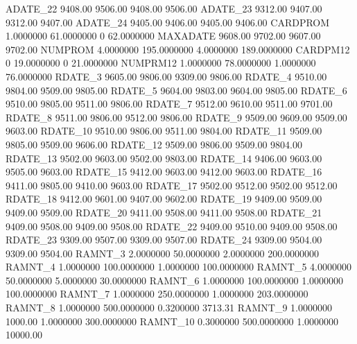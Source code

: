\documentclass[
  11pt,
  a4paper,
  DIV=12,captions=tableheading,oneside,titlepage]{scrbook}
\let\oldverbatim\verbatim
\let\endoldverbatim\endverbatim
\renewenvironment{verbatim}{\footnotesize\oldverbatim}{\endoldverbatim}
\begin{document}
\begin{verbatim}
  ADATE_22         9408.00       9506.00       9408.00       9506.00 
  ADATE_23         9312.00       9407.00       9312.00       9407.00 
  ADATE_24         9405.00       9406.00       9405.00       9406.00 
  CARDPROM       1.0000000    61.0000000             0    62.0000000 
  MAXADATE         9608.00       9702.00       9607.00       9702.00 
  NUMPROM        4.0000000   195.0000000     4.0000000   189.0000000 
  CARDPM12               0    19.0000000             0    21.0000000 
  NUMPRM12       1.0000000    78.0000000     1.0000000    76.0000000 
  RDATE_3          9605.00       9806.00       9309.00       9806.00 
  RDATE_4          9510.00       9804.00       9509.00       9805.00 
  RDATE_5          9604.00       9803.00       9604.00       9805.00 
  RDATE_6          9510.00       9805.00       9511.00       9806.00 
  RDATE_7          9512.00       9610.00       9511.00       9701.00 
  RDATE_8          9511.00       9806.00       9512.00       9806.00 
  RDATE_9          9509.00       9609.00       9509.00       9603.00 
  RDATE_10         9510.00       9806.00       9511.00       9804.00 
  RDATE_11         9509.00       9805.00       9509.00       9606.00 
  RDATE_12         9509.00       9806.00       9509.00       9804.00 
  RDATE_13         9502.00       9603.00       9502.00       9803.00 
  RDATE_14         9406.00       9603.00       9505.00       9603.00 
  RDATE_15         9412.00       9603.00       9412.00       9603.00 
  RDATE_16         9411.00       9805.00       9410.00       9603.00 
  RDATE_17         9502.00       9512.00       9502.00       9512.00 
  RDATE_18         9412.00       9601.00       9407.00       9602.00 
  RDATE_19         9409.00       9509.00       9409.00       9509.00 
  RDATE_20         9411.00       9508.00       9411.00       9508.00 
  RDATE_21         9409.00       9508.00       9409.00       9508.00 
  RDATE_22         9409.00       9510.00       9409.00       9508.00 
  RDATE_23         9309.00       9507.00       9309.00       9507.00 
  RDATE_24         9309.00       9504.00       9309.00       9504.00 
  RAMNT_3        2.0000000    50.0000000     2.0000000   200.0000000 
  RAMNT_4        1.0000000   100.0000000     1.0000000   100.0000000 
  RAMNT_5        4.0000000    50.0000000     5.0000000    30.0000000 
  RAMNT_6        1.0000000   100.0000000     1.0000000   100.0000000 
  RAMNT_7        1.0000000   250.0000000     1.0000000   203.0000000 
  RAMNT_8        1.0000000   500.0000000     0.3200000       3713.31 
  RAMNT_9        1.0000000       1000.00     1.0000000   300.0000000 
  RAMNT_10       0.3000000   500.0000000     1.0000000      10000.00 

\end{verbatim}
\end{document}
